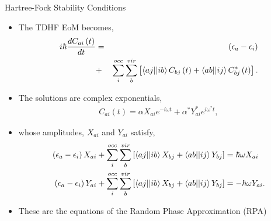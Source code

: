 \documentclass[10pt]{beamer}
\begin{document}
{{{{{\begin{frame}{Hartree-Fock Stability Conditions}
	\begin{itemize}[<+->]
		\item[]{The TDHF EoM becomes,
			\begin{eqnarray}
				i\hbar \frac{dC_{ai} \left(t\right) }{dt} &=& \left(\epsilon_a - \epsilon_i \right) \nonumber
					\\ &+& \sum\limits_{i}^{occ}  \sum\limits_{b}^{vir}
					  \left[\braket{aj||ib}C_{bj}   \left( t \right)
						  +\braket{ab||ij}C_{bj}^* \left( t \right) \right].
			\end{eqnarray}
		}
		\item[]{The solutions are complex exponentials,
			\begin{eqnarray}
				C_{ai} \left(t \right)  = \alpha X_{ai} e^{-i \omega t} + \alpha^* Y_{ai}^* e^{i \omega^* t},
			\end{eqnarray}
		}
		\item[]{whose amplitudes, $X_{ai}$ and $Y_{ai}$ satisfy,
			\begin{align}
				\left(\epsilon_a - \epsilon_i \right)X_{ai} + \sum\limits_{i}^{occ}  \sum\limits_{b}^{vir}
					\left[ \braket{aj||ib}X_{bj} + \braket{ab||ij}Y_{bj} \right] &= \hbar \omega X_{ai}
				\nonumber \\
				\left(\epsilon_a - \epsilon_i \right)Y_{ai} + \sum\limits_{i}^{occ}  \sum\limits_{b}^{vir}
					\left[ \braket{aj||ib}X_{bj} + \braket{ab||ij}Y_{bj} \right] &= -\hbar \omega Y_{ai}.
			\end{align}
		}
		\item[]{These are the equations of the Random Phase Approximation (RPA)}
	\end{itemize}
\end{frame}

{%

}}}}}}
\end{document}
